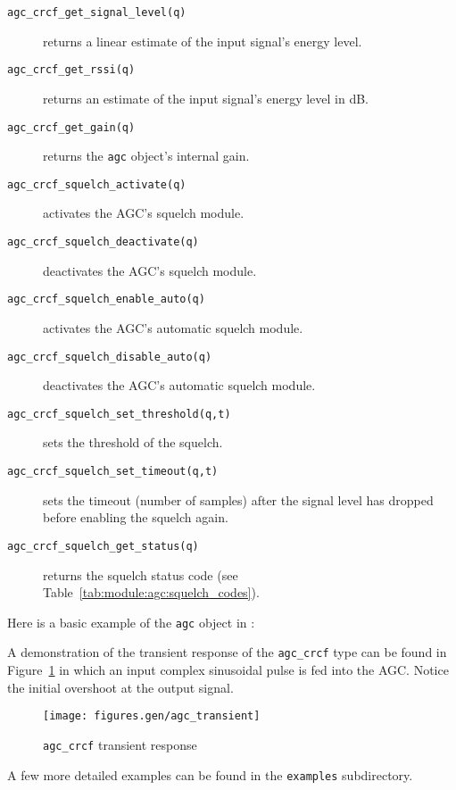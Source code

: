 \begin{description}
\item[{\tt agc\_crcf\_get\_signal\_level(q)}]
    returns a linear estimate of the input signal's energy level.
\item[{\tt agc\_crcf\_get\_rssi(q)}]
    returns an estimate of the input signal's energy level in dB.
\item[{\tt agc\_crcf\_get\_gain(q)}]
    returns the {\tt agc} object's internal gain.
\item[{\tt agc\_crcf\_squelch\_activate(q)}]
    activates the AGC's squelch module.
\item[{\tt agc\_crcf\_squelch\_deactivate(q)}]
    deactivates the AGC's squelch module.
\item[{\tt agc\_crcf\_squelch\_enable\_auto(q)}]
    activates the AGC's automatic squelch module.
\item[{\tt agc\_crcf\_squelch\_disable\_auto(q)}]
    deactivates the AGC's automatic squelch module.
\item[{\tt agc\_crcf\_squelch\_set\_threshold(q,t)}]
    sets the threshold of the squelch.
\item[{\tt agc\_crcf\_squelch\_set\_timeout(q,t)}]
    sets the timeout (number of samples) after the signal level has dropped
    before enabling the squelch again.
\item[{\tt agc\_crcf\_squelch\_get\_status(q)}]
    returns the squelch status code
    (see Table~\ref{tab:module:agc:squelch_codes}).
\end{description}
%
Here is a basic example of the {\tt agc} object in \liquid:
%

%
A demonstration of the transient response of the {\tt agc\_crcf} type can be
found in Figure~\ref{fig:module:agc:transient} in which an input complex
sinusoidal pulse is fed into the AGC.
Notice the initial overshoot at the output signal.%
%
\begin{figure}
\centering
  \texttt{[image: figures.gen/agc\_transient]}
\caption{{\tt agc\_crcf} transient response}
\label{fig:module:agc:transient}
\end{figure}
%
A few more detailed examples can be found in the {\tt examples}
subdirectory.

